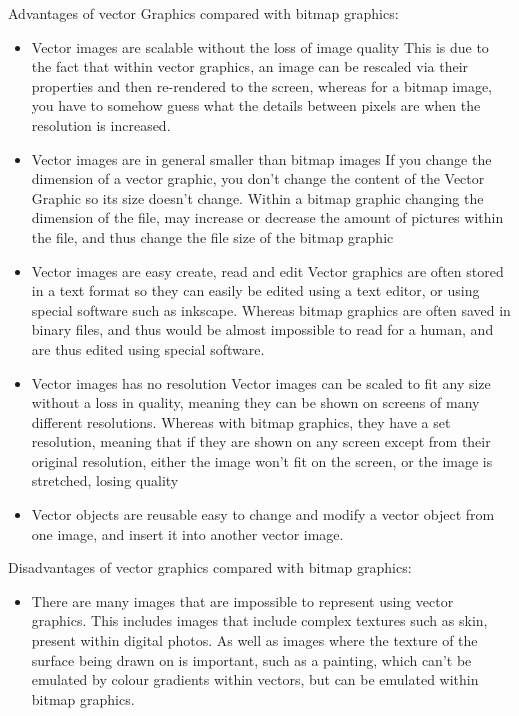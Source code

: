  \noindent
  Advantages of vector Graphics compared with bitmap graphics:
  \begin{itemize}
  	\item Vector images are scalable without the loss of image quality
	  	\subitem This is due to the fact that within vector graphics, an image can be rescaled via their properties and then re-rendered to the screen, whereas for a bitmap image, you have to somehow guess what the details between pixels are when the resolution is increased.
  	\item Vector images are in general smaller than bitmap images
	  	\subitem If you change the dimension of a vector graphic, you don't change the content of the Vector Graphic so its size doesn't change. Within a bitmap graphic changing the dimension of the file, may increase or decrease the amount of pictures within the file, and thus change the file size of the bitmap graphic
	\item Vector images are easy create, read and edit
		\subitem Vector graphics are often stored in a text format so they can easily be edited using a text editor, or using special software such as inkscape. Whereas bitmap graphics are often saved in binary files, and thus would be almost impossible to read for a human, and are thus edited using special software.
	\item Vector images has no resolution
		\subitem Vector images can be scaled to fit any size without a loss in quality, meaning they can be shown on screens of many different resolutions. Whereas with bitmap graphics, they have a set resolution, meaning that if they are shown on any screen except from their original resolution, either the image won't fit on the screen, or the image is stretched, losing quality
	\item Vector objects are reusable
		\subitem easy to change and modify a vector object from one image, and insert it into another vector image.
  \end{itemize}
  
  Disadvantages of vector graphics compared with bitmap graphics:
  \begin{itemize}
  	\item There are many images that are impossible to represent using vector graphics.
	  	\subitem This includes images that include complex textures such as skin, present within digital photos. As well as images where the texture of the surface being drawn on is important, such as a painting, which can't be emulated by colour gradients within vectors, but can be emulated within bitmap graphics.
  \end{itemize}
  
